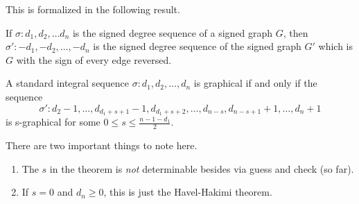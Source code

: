 \begin{frame}
    This is formalized in the following result.

    \begin{lemma}
        If $\sigma : d_1,d_2,\dots d_n$ is the signed degree sequence of a signed graph $G$, then $\sigma' : -d_1,-d_2,\dots,-d_n$ is the signed degree sequence of the signed graph $G'$ which is $G$ with the sign of every edge reversed.
    \end{lemma}
\end{frame}

\begin{frame}
    \begin{theorem}
        A standard integral sequence $\sigma : d_1,d_2,\dots,d_n$ is graphical if and only if the sequence
        \begin{equation*}
            \sigma' : d_2-1,\dots,d_{d_1+s+1}-1,d_{d_1+s+2},\dots,d_{n-s},d_{n-s+1}+1,\dots,d_n+1
        \end{equation*}
        is s-graphical for some $0 \leq s \leq \frac{n-1-d_1}{2}$.
    \end{theorem}
    There are two important things to note here.
    \begin{enumerate}
        \item The $s$ in the theorem is \textit{not} determinable besides via guess and check (so far).
        \item If $s = 0$ and $d_n \geq 0$, this is just the Havel-Hakimi theorem.
    \end{enumerate}
\end{frame}
